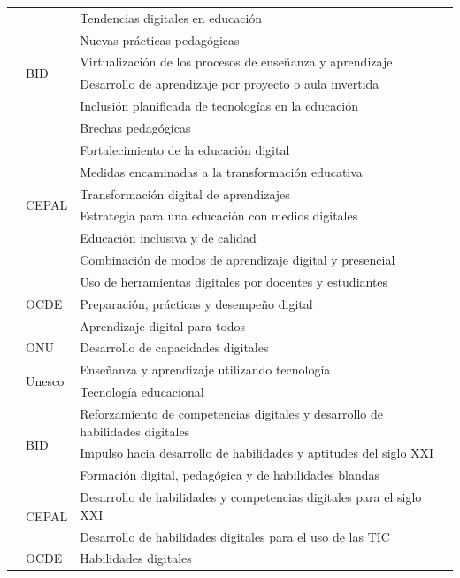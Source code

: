 \begin{longtable}{
>{\raggedright\arraybackslash}p{} l >{\raggedright\arraybackslash}p{}}
\midrule
    \multirow{18}{=}{Aspecto educativo} & \multirow{6}{*}{BID} &
    Tendencias digitales en educación \\
    & & Nuevas prácticas pedagógicas \\
    & & Virtualización de los procesos de enseñanza y aprendizaje \\
    & & Desarrollo de aprendizaje por proyecto o aula invertida \\
    & & Inclusión planificada de tecnologías en la educación \\
    & & Brechas pedagógicas \\
    & \multirow{6}{*}{CEPAL} & Fortalecimiento de la educación digital \\
    & & Medidas encaminadas a la transformación educativa \\
    & & Transformación digital de aprendizajes \\
    & & Estrategia para una educación con medios digitales \\
    & & Educación inclusiva y de calidad \\
    & & Combinación de modos de aprendizaje digital y presencial \\
    & \multirow{3}{*}{OCDE} & Uso de herramientas digitales por docentes y
    estudiantes \\
    & & Preparación, prácticas y desempeño digital \\
    & & Aprendizaje digital para todos \\
    & ONU & Desarrollo de capacidades digitales \\
    & \multirow{2}{*}{Unesco} & Enseñanza y aprendizaje utilizando
    tecnología \\
    & & Tecnología educacional \\
\midrule
    \multirow{13}{=}{Habilidades y competencias} &
    \multirow{3}{*}{BID} & Reforzamiento de competencias digitales y
    desarrollo de habilidades digitales \\
    & & Impulso hacia desarrollo de habilidades y aptitudes del siglo XXI \\
    & & Formación digital, pedagógica y de habilidades blandas \\
    & \multirow{2}{*}{CEPAL} & Desarrollo de habilidades y competencias
    digitales para el siglo XXI \\
    & & Desarrollo de habilidades digitales para el uso de las TIC \\
    & \multirow{2}{*}{OCDE} & Habilidades digitales \\

\end{longtable}
